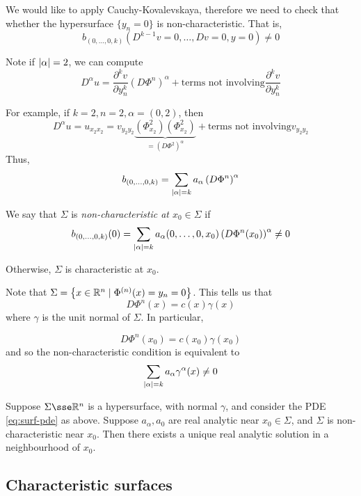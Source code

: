 \documentclass{article}
\begin{document}
\lec

We would like to apply Cauchy-Kovalevskaya, therefore we need to check that whether the hypersurface \(\{y_n = 0\}\) is non-characteristic. That is,
\[b_{(0, \dots, 0, k)}(D^{k-1}v = 0, \dots, Dv = 0, y = 0) \ne 0\]

Note if \(\abs{\alpha} = 2\), we can compute
\[D^\alpha u = \frac{\partial^kv}{\partial y_n^k}(D\Phi^n)^\alpha + \text{terms not involving} \frac{\partial^kv}{\partial y_n^k}\]

For example, if \(k = 2, n = 2, \alpha = (0, 2)\), then
\[D^\alpha u = u_{x_2x_2} = v_{y_2y_2}\underbrace{(\Phi^2_{x_2})(\Phi^2_{x_2})}_{=(D\Phi^2)^\alpha} + \text{terms not involving} v_{y_2y_2}\]
Thus,
\[b_{(0, \dots, 0, k)} = \sum_{\abs{\alpha} = k}a_\alpha \left(D \Phi^n\right)^\alpha\]

\begin{definition}
    We say that \(\Sigma\) is \emph{non-characteristic at \(x_0 \in \Sigma\)} if
    \[b_{(0, \dots, 0, k)}(0) = \sum_{\abs{\alpha} = k}a_\alpha(0, \dots, 0, x_0)\left(D\Phi^n(x_0)\right)^\alpha \ne 0\]

    Otherwise, \(\Sigma\) is characteristic at \(x_0\).
\end{definition}

\begin{remark}
    Note that \(\Sigma = \left\{x \in \mathbb{R}^n \mid \Phi^{(n)}(x) = y_n = 0\right\}\). This tells us that
    \[D\Phi^n(x) = c(x)\gamma(x)\]
    where \(\gamma\) is the unit normal of \(\Sigma\). In particular,

    \[D\Phi^n(x_0) = c(x_0)\gamma(x_0)\]
    and so the non-characteristic condition is equivalent to
    \[\sum_{\abs{\alpha} = k}a_\alpha\gamma^\alpha(x) \ne 0\]
\end{remark}

\begin{theorem}
     Suppose \(\Sigma \sse \R^n\) is a hypersurface, with normal \(\gamma\), and consider the PDE \cref{eq:surf-pde} as above. Suppose \(a_\alpha, a_0\) are real analytic near \(x_0 \in \Sigma\), and \(\Sigma\) is non-characteristic near \(x_0\). Then there exists a unique real analytic solution in a neighbourhood of \(x_0\).
\end{theorem}

\subsection{Characteristic surfaces}
\end{document}
